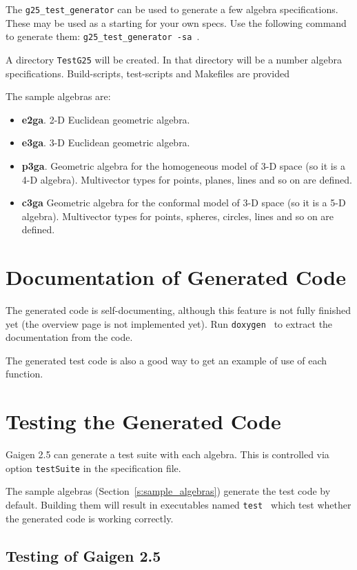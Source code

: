 \documentclass[10pt, a4paper]{article}
\begin{document}
The {\tt g25\_test\_generator} can be used to generate a few algebra specifications.
These may be used as a starting for your own specs. Use the following command
to generate them: {\tt g25\_test\_generator -sa }.


A directory {\tt TestG25} will be created. In that directory will be a number algebra specifications.
Build-scripts, test-scripts and Makefiles are provided

The sample algebras are:
\begin{itemize}
\item {\bf e2ga}. 2-D Euclidean geometric algebra.
\item {\bf e3ga}. 3-D Euclidean geometric algebra.
\item {\bf p3ga}. Geometric algebra for the homogeneous model of 3-D space (so it is a 4-D algebra).
Multivector types for points, planes, lines and so on are defined.
\item {\bf c3ga} Geometric algebra for the conformal model of 3-D space (so it is a 5-D algebra).
Multivector types for points, spheres, circles, lines and so on are defined.
\end{itemize}

\section{Documentation of Generated Code}

The generated code is self-documenting, although this
feature is not fully finished yet (the overview page
is not implemented yet). Run {\tt doxygen } to extract
the documentation from the code.

The generated test code is also a good way to get an example
of use of each function.


\section{Testing the Generated Code}

Gaigen 2.5 can generate a test suite with each algebra.
This is controlled via option {\tt testSuite} in the specification file.

The sample algebras (Section~\ref{s:sample_algebras}) generate the test 
code by default. Building them will result in executables named 
{\tt test } which test whether the generated code is working correctly. 


\subsection{Testing of Gaigen 2.5}
\end{document}

